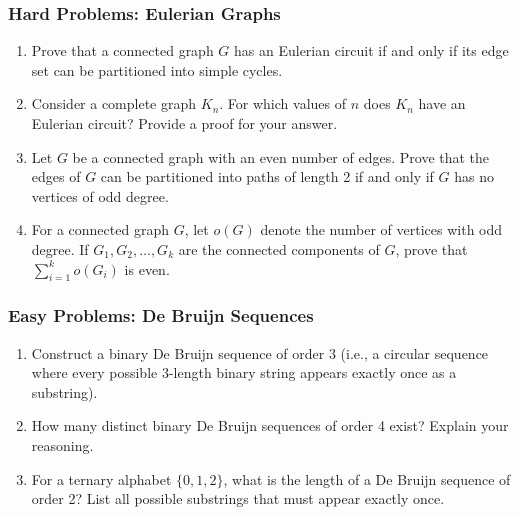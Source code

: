 \documentclass{article}
\theoremstyle{definition}
\begin{document}
\subsubsection{Hard Problems: Eulerian Graphs}
\begin{enumerate}[resume]
    \item Prove that a connected graph $G$ has an Eulerian circuit if and only if its edge set can be partitioned into simple cycles.
    
    \item Consider a complete graph $K_n$. For which values of $n$ does $K_n$ have an Eulerian circuit? Provide a proof for your answer.
    
    \item Let $G$ be a connected graph with an even number of edges. Prove that the edges of $G$ can be partitioned into paths of length 2 if and only if $G$ has no vertices of odd degree.
    
    \item For a connected graph $G$, let $o(G)$ denote the number of vertices with odd degree. If $G_1, G_2, \ldots, G_k$ are the connected components of $G$, prove that $\sum_{i=1}^{k} o(G_i)$ is even.
\end{enumerate}

\subsubsection{Easy Problems: De Bruijn Sequences}
\begin{enumerate}[resume]
    \item Construct a binary De Bruijn sequence of order 3 (i.e., a circular sequence where every possible 3-length binary string appears exactly once as a substring).
    
    \item How many distinct binary De Bruijn sequences of order 4 exist? Explain your reasoning.
    
    \item For a ternary alphabet $\{0,1,2\}$, what is the length of a De Bruijn sequence of order 2? List all possible substrings that must appear exactly once.
    
    
\end{enumerate}
\end{document}
